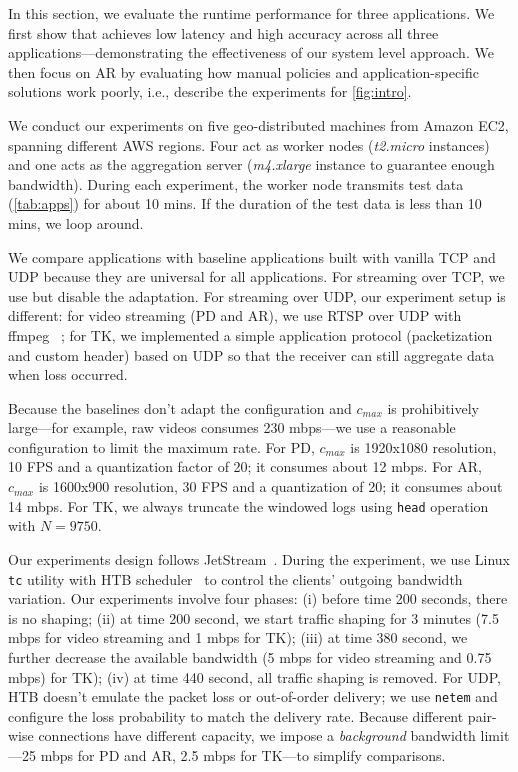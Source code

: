 In this section, we evaluate the runtime performance for three applications. We
first show that \sysname{} achieves low latency and high accuracy across all
three applications---demonstrating the effectiveness of our system level
approach. We then focus on AR by evaluating how manual policies and
application-specific solutions work poorly, i.e., describe the experiments for
\autoref{fig:intro}.

We conduct our experiments on five geo-distributed machines from Amazon EC2,
spanning different AWS regions. Four act as worker nodes (\textit{t2.micro}
instances) and one acts as the aggregation server (\textit{m4.xlarge} instance
to guarantee enough bandwidth). During each experiment, the worker node
transmits test data (\autoref{tab:apps}) for about 10 mins. If the duration of
the test data is less than 10 mins, we loop around.

We compare \sysname{} applications with baseline applications built with vanilla
TCP and UDP because they are universal for all applications. For streaming over
TCP, we use \sysname{} but disable the adaptation. For streaming over UDP, our
experiment setup is different: for video streaming (PD and AR), we use RTSP over
UDP with ffmpeg~\cite{bellard2012ffmpeg} ; for TK, we implemented a simple
application protocol (packetization and custom header) based on UDP so that the
receiver can still aggregate data when loss occurred.

Because the baselines don't adapt the configuration and $c_{max}$ is
prohibitively large---for example, raw videos consumes 230 mbps---we use a
reasonable configuration to limit the maximum rate. For PD, $c_{max}$ is
1920x1080 resolution, 10 FPS and a quantization factor of 20; it consumes about
12 mbps. For AR, $c_{max}$ is 1600x900 resolution, 30 FPS and a quantization of
20; it consumes about 14 mbps. For TK, we always truncate the windowed logs
using \texttt{head} operation with $N=9750$.

Our experiments design follows JetStream~\cite{rabkin2014aggregation}. During
the experiment, we use Linux \texttt{tc} utility with HTB scheduler~\cite{lartc,
  htb} to control the clients' outgoing bandwidth variation. Our experiments
involve four phases: (i) before time 200 seconds, there is no shaping; (ii) at
time 200 second, we start traffic shaping for 3 minutes (7.5 mbps for video
streaming and 1 mbps for TK); (iii) at time 380 second, we further decrease the
available bandwidth (5 mbps for video streaming and 0.75 mbps) for TK); (iv) at
time 440 second, all traffic shaping is removed. For UDP, HTB doesn't emulate
the packet loss or out-of-order delivery; we use \texttt{netem} and configure
the loss probability to match the delivery rate. Because different pair-wise
connections have different capacity, we impose a \textit{background} bandwidth
limit---25 mbps for PD and AR, 2.5 mbps for TK---to simplify comparisons.

